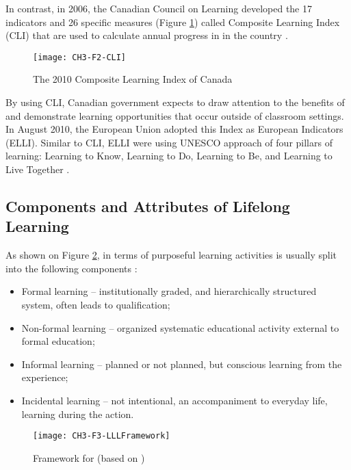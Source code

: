 In contrast, in 2006, the Canadian Council on Learning developed the 17
indicators and 26 specific measures (Figure \ref{fig:cli2010}) called Composite
Learning Index (CLI) that are used to calculate annual progress in \LLLs in the
country \citep{CanadianCouncilonLearning2011}. 

\begin{figure}[htb]
\centering 
\texttt{[image: CH3-F2-CLI]}
\caption[The 2010 Composite Learning Index of Canada]{The 2010 Composite
Learning Index of Canada \citep{CanadianCouncilonLearning2011}}
\label{fig:cli2010}
\end{figure}

By using CLI, Canadian government expects to draw attention to the benefits of
\LLLs and demonstrate learning opportunities that occur outside of classroom
settings. In August 2010, the European Union adopted this Index as European
\LLLc Indicators (ELLI). Similar to CLI, ELLI were using UNESCO approach of four
pillars of learning: Learning to Know, Learning to Do, Learning to Be, and
Learning to Live Together \citep{ELLIDevelopmentTeam2010}.

\FloatBarrier

\subsection{Components and Attributes of Lifelong Learning}
As shown on Figure \ref{fig:lllfmwrk}, in terms of purposeful learning
activities \LLLs is usually split into the following components
\citep{Longworth2003, Tuijnman2002}:

\begin{itemize}
  \item Formal learning -- institutionally graded, and hierarchically structured
system, often leads to qualification;
  \item Non-formal learning -- organized systematic educational activity
  external to formal education;
  \item Informal learning -- planned or not planned, but conscious learning from
the experience;
  \item Incidental learning -- not intentional, an accompaniment to everyday
  life, learning during the action.
\end{itemize} 

\begin{figure}[htb]
\centering
\texttt{[image: CH3-F3-LLLFramework]}
\caption[Framework for \LLLc]{Framework for \LLLc (based on
\citealp[p.~11]{Divjak2004})}
\label{fig:lllfmwrk}
\end{figure}

